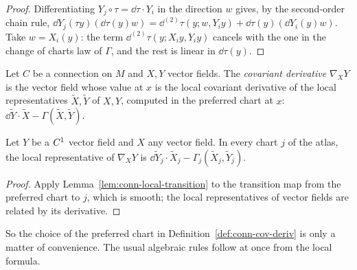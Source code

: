 \begin{proof}
  \leanok
  Differentiating $Y_j \circ \tau = \dd\tau \cdot Y_i$ in the direction $w$ gives, by the
  second-order chain rule,
  $\dd Y_j(\tau y)(\dd\tau(y) w) = \dd^{(2)}\tau(y; w, Y_i y) + \dd\tau(y)(\dd Y_i(y) w)$. Take
  $w = X_i(y)$: the term $\dd^{(2)}\tau(y; X_i y, Y_i y)$ cancels with the one in the change of
  charts law of $\Gamma$, and the rest is linear in $\dd\tau(y)$.
\end{proof}

\begin{definition}
  \label{def:conn-cov-deriv}
  \leanok
  Let $C$ be a connection on $M$ and $X, Y$ vector fields. The \emph{covariant derivative}
  $\nabla_X Y$ is the vector field whose value at $x$ is the local covariant derivative of the
  local representatives $\tilde X, \tilde Y$ of $X, Y$, computed in the preferred chart at $x$:
  $\dd\tilde Y \cdot \tilde X - \Gamma(\tilde X, \tilde Y)$.
\end{definition}

\begin{theorem}
  \label{thm:conn-cov-deriv-chart}
  \leanok
  Let $Y$ be a $C^{1}$ vector field and $X$ any vector field. In every chart $j$ of the atlas,
  the local representative of $\nabla_X Y$ is
  $\dd\tilde Y_j \cdot \tilde X_j - \Gamma_j(\tilde X_j, \tilde Y_j)$.
\end{theorem}

\begin{proof}
  \leanok
  Apply Lemma~\ref{lem:conn-local-transition} to the transition map from the preferred chart to
  $j$, which is smooth; the local representatives of vector fields are related by its
  derivative.
\end{proof}

So the choice of the preferred chart in Definition~\ref{def:conn-cov-deriv} is only a matter of
convenience. The usual algebraic rules follow at once from the local formula.

